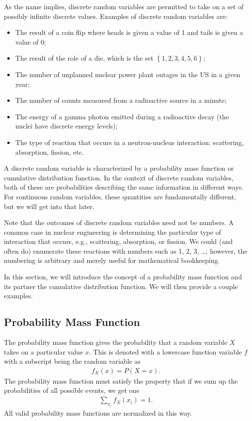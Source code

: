 As the name implies, discrete random variables are permitted to take on a set of possibly infinite discrete values. Examples of discrete random variables are:
\begin{itemize}
  \item The result of a coin flip where heads is given a value of 1 and tails is given a value of 0;
  \item The result of the role of a die, which is the set $\left\{ 1, 2, 3, 4, 5, 6 \right\}$;
  \item The number of unplanned nuclear power plant outages in the US in a given year;
  \item The number of counts measured from a radioactive source in a minute;
  \item The energy of a gamma photon emitted during a radioactive decay (the nuclei have discrete energy levels);
  \item The type of reaction that occurs in a neutron-nucleus interaction: scattering, absorption, fission, etc.
\end{itemize}
A discrete random variable is characterized by a probability mass function or cumulative distribution function. In the context of discrete random variables, both of these are probabilities describing the same information in different ways. For continuous random variables, these quantities are fundamentally different, but we will get into that later.

Note that the outcomes of discrete random variables need not be numbers. A common case in nuclear engineering is determining the particular type of interaction that occurs, e.g., scattering, absorption, or fission. We could (and often do) enumerate these reactions with numbers such as 1, 2, 3, \ldots; however, the numbering is arbitrary and merely useful for mathematical bookkeeping.

In this section, we will introduce the concept of a probability mass function and its partner the cumulative distribution function. We will then provide a couple examples. 

\subsection{Probability Mass Function}

The probability mass function gives the probability that a random variable $X$ takes on a particular value $x$. This is denoted with a lowercase function variable $f$ with a subscript being the random variable as
\begin{align}
  f_X(x) = P( X = x ) .
\end{align}
The probability mass function must satisfy the property that if we sum up the probabilities of all possible events, we get one
\begin{align}
  \sum_{x_i} f_X(x_i) = 1 .
\end{align}
All valid probability mass functions are normalized in this way.

